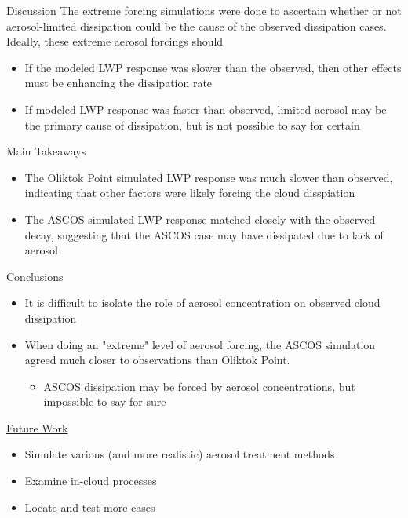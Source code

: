 \documentclass[final]{beamer}
\newlength{\onecolwid}
\begin{document}
\begin{frame}[t]
\begin{columns}[t]
\begin{column}{\onecolwid}
	\begin{block}{Discussion}
		The extreme forcing simulations were done to ascertain whether or not aerosol-limited dissipation could be the cause of the observed dissipation cases. Ideally, these extreme aerosol forcings should

		\begin{itemize}
			\item If the modeled LWP response was slower than the observed, then other effects must be enhancing the dissipation rate
			\item If modeled LWP response was faster than observed, limited aerosol may be the primary cause of dissipation, but is not possible to say for certain
		\end{itemize}
		
	\end{block}
	\begin{alertblock}{Main Takeaways}
		\begin{itemize}
			\item The Oliktok Point simulated LWP response was much slower than observed, indicating that other factors were likely forcing the cloud disspiation	
			\item The ASCOS simulated LWP response matched closely with the observed decay, suggesting that the ASCOS case may have dissipated due to lack of aerosol
		\end{itemize}
	\end{alertblock}
	
	\begin{block}{Conclusions}
		\begin{itemize}
			\item It is difficult to isolate the role of aerosol concentration on observed cloud dissipation
			\item When doing an "extreme" level of aerosol forcing, the ASCOS simulation agreed much closer to observations than Oliktok Point.
			\begin{itemize}
				\item ASCOS dissipation may be forced by aerosol concentrations, but impossible to say for sure
			\end{itemize}
		\end{itemize}
		
		\underline{Future Work}
		\begin{itemize}
			\item Simulate various (and more realistic) aerosol treatment methods
			\item Examine in-cloud processes
			\item Locate and test more cases
		\end{itemize}
		

\end{block}
\end{column}
\end{columns}
\end{frame}
\end{document}
